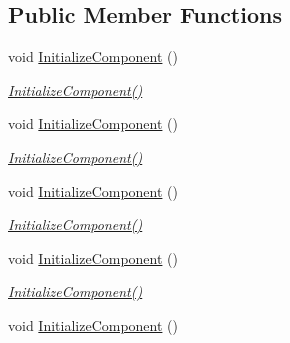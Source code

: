 \subsection*{Public Member Functions}
\begin{DoxyCompactItemize}
\item 
void \mbox{\hyperlink{class_r_f_storage_1_1_view_1_1_organisation_1_1_organisation_liste_indlevering_v_a4faf281a2fce600af22aea17b58238e2}{Initialize\+Component}} ()
\begin{DoxyCompactList}\small\item\em \mbox{\hyperlink{class_r_f_storage_1_1_view_1_1_organisation_1_1_organisation_liste_indlevering_v_a4faf281a2fce600af22aea17b58238e2}{Initialize\+Component()}} \end{DoxyCompactList}\item 
void \mbox{\hyperlink{class_r_f_storage_1_1_view_1_1_organisation_1_1_organisation_liste_indlevering_v_a4faf281a2fce600af22aea17b58238e2}{Initialize\+Component}} ()
\begin{DoxyCompactList}\small\item\em \mbox{\hyperlink{class_r_f_storage_1_1_view_1_1_organisation_1_1_organisation_liste_indlevering_v_a4faf281a2fce600af22aea17b58238e2}{Initialize\+Component()}} \end{DoxyCompactList}\item 
void \mbox{\hyperlink{class_r_f_storage_1_1_view_1_1_organisation_1_1_organisation_liste_indlevering_v_a4faf281a2fce600af22aea17b58238e2}{Initialize\+Component}} ()
\begin{DoxyCompactList}\small\item\em \mbox{\hyperlink{class_r_f_storage_1_1_view_1_1_organisation_1_1_organisation_liste_indlevering_v_a4faf281a2fce600af22aea17b58238e2}{Initialize\+Component()}} \end{DoxyCompactList}\item 
void \mbox{\hyperlink{class_r_f_storage_1_1_view_1_1_organisation_1_1_organisation_liste_indlevering_v_a4faf281a2fce600af22aea17b58238e2}{Initialize\+Component}} ()
\begin{DoxyCompactList}\small\item\em \mbox{\hyperlink{class_r_f_storage_1_1_view_1_1_organisation_1_1_organisation_liste_indlevering_v_a4faf281a2fce600af22aea17b58238e2}{Initialize\+Component()}} \end{DoxyCompactList}\item 
void \mbox{\hyperlink{class_r_f_storage_1_1_view_1_1_organisation_1_1_organisation_liste_indlevering_v_a4faf281a2fce600af22aea17b58238e2}{Initialize\+Component}} ()

\end{DoxyCompactItemize}
